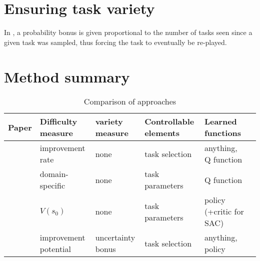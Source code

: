 \documentclass[letterpaper]{article}
\theoremstyle{definition}
\begin{document}
\section{Ensuring task variety} \label{sec:variety}

In \cite{Jiang2020}, a probability bonus is given proportional to the number of tasks seen since a given task was sampled, thus forcing the task to eventually be re-played.

\section{Method summary} \label{sec:summary}

\begin{table*}
\caption{Comparison of approaches}
\begin{tabular}{|l | l | l | l  | l| l|}
	\hline
	Paper & Difficulty measure & variety measure  & Controllable elements & Learned functions    \\ \hline	
	\cite{Matiisen2020} & improvement rate & none & task selection & anything, Q function \\ \hline
	\cite{Feng2020} & domain-specific & none & task parameters & Q function \\ \hline
	\cite{Klink2020} & $V(s_0)$ & none & task parameters & policy (+critic for SAC) \\ \hline
	\cite{Jiang2020} & improvement potential & uncertainty bonus & task selection & anything, policy \\ \hline
	
\end{tabular}
\end{table*}

\clearpage


\end{document}
